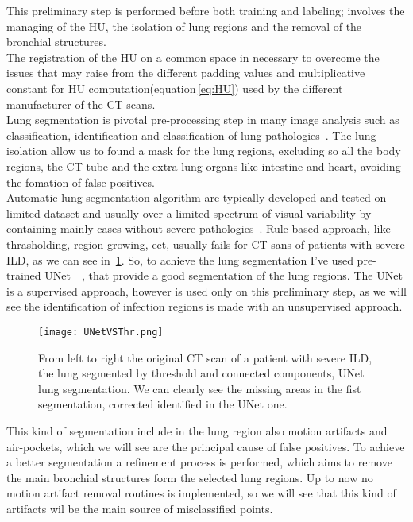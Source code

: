 \documentclass{standalone}
\begin{document}
	This preliminary step is performed before both training and labeling; involves the managing of the HU, the isolation of lung regions and the removal of the bronchial structures.\\
	The registration of the HU on a common space in necessary to overcome the issues that may raise from the different padding values and multiplicative constant for HU computation(equation\,\ref{eq:HU}) used by the different manufacturer of the CT scans.\\
	Lung segmentation is pivotal pre-processing step in many image analysis such as classification, identification and classification of lung pathologies~\cite{ART:Johannes}. The lung isolation allow us to found a mask for the lung regions, excluding so all the body regions, the CT tube and the extra-lung organs like intestine and heart, avoiding the fomation of false positives.\\
	Automatic lung segmentation algorithm are typically developed and tested on limited dataset and usually over a limited spectrum of visual variability by containing mainly cases without severe pathologies~\cite{ART:Johannes}. Rule based approach, like thrasholding, region growing, ect, usually fails for CT sans of patients with severe ILD, as we can see in \figurename\,\ref{fig:UNetVSThr}. So, to achieve the lung segmentation I've used  pre-trained UNet~\cite{ART:Johannes}~\cite{REP:lungmask}, that provide a good segmentation of the lung regions. 
	The UNet is a supervised approach, however is used only on this preliminary step, as we will see the identification of infection regions is made with an unsupervised approach.\\
	
	\begin{figure}[h!]
		\centering
		\texttt{[image: UNetVSThr.png]}
		\caption{From left to right the original CT scan of a patient with severe ILD, the lung segmented by threshold and connected components, UNet lung segmentation. We can clearly see the missing areas in the fist segmentation, corrected identified in the UNet one.}\label{fig:UNetVSThr}
		
	\end{figure}
	
	This kind of segmentation include in the lung region also motion artifacts and air-pockets, which we will see are the principal cause of false positives. To achieve a better segmentation a refinement process is performed, which aims to remove the main bronchial structures form the selected lung regions. Up to now no motion artifact removal routines is implemented, so we will see that this kind of artifacts wil be the main source of misclassified points. 
	
\end{document}
